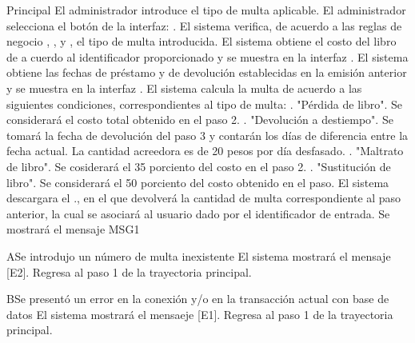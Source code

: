 \begin{UCtrayectoria}{Principal}
	\UCpaso[\UCactor] El administrador introduce el tipo de multa aplicable. 
	\UCpaso[\UCactor] El administrador selecciona el botón  de la interfaz: .
	\UCpaso[\UCsist] El sistema verifica, de acuerdo a las reglas de negocio , ,  y , el tipo de multa introducida.
	\UCpaso[\UCsist] El sistema obtiene el costo del libro de a cuerdo al identificador proporcionado y se muestra en la interfaz . 
	\UCpaso[\UCsist] El sistema obtiene las fechas de préstamo y de devolución establecidas en la emisión anterior y se muestra en la interfaz . 
	\UCpaso[\UCsist] El sistema calcula la multa de acuerdo a las siguientes condiciones, correspondientes al tipo de multa: . "Pérdida de libro". Se considerará el costo total obtenido en el paso 2. . "Devolución a destiempo". Se tomará la fecha de devolución del paso 3 y contarán los días de diferencia entre la fecha actual. La cantidad acreedora es de 20 pesos por día desfasado. . "Maltrato de libro". Se cosiderará el 35 porciento del costo en el paso 2. . "Sustitución de libro". Se considerará el 50 porciento del costo obtenido en el paso.
	\UCpaso[\UCsist] El sistema descargara el ., en el que devolverá la cantidad de multa correspondiente al paso anterior, la cual se asociará al usuario dado por el identificador de entrada.  
	\UCpaso[\UCsist] Se mostrará el mensaje MSG1
\end{UCtrayectoria}
\begin{UCtrayectoriaA}{A}{Se introdujo un número de multa inexistente}	
			\UCpaso[\UCsist] El sistema mostrará el mensaje [E2].
			\UCpaso[\UCsist] Regresa al paso 1 de la trayectoria principal. 
\end{UCtrayectoriaA}
\begin{UCtrayectoriaA}{B}{Se presentó un error en la conexión y/o en la transacción actual con base de datos}
			\UCpaso[\UCsist] El sistema mostrará el mensaeje [E1].
			\UCpaso[\UCsist] Regresa al paso 1 de la trayectoria principal.
\end{UCtrayectoriaA}
